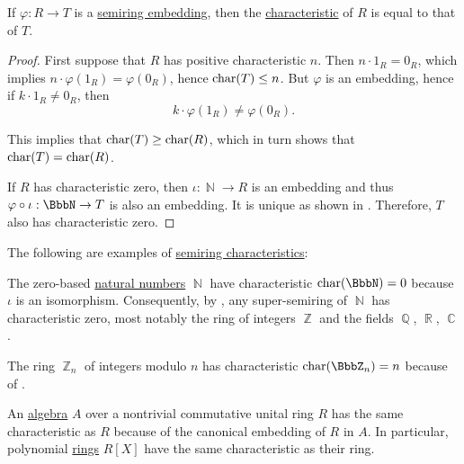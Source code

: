 \begin{proposition}\label{thm:semiring_embedding_preserves_characterstic}
  If \( \varphi: R \to T \) is a \hyperref[def:semiring/homomorphism]{semiring embedding}, then the \hyperref[def:semiring_characteristic]{characteristic} of \( R \) is equal to that of \( T \).
\end{proposition}
\begin{proof}
  First suppose that \( R \) has positive characteristic \( n \). Then \( n \cdot 1_R = 0_R \), which implies \( n \cdot \varphi(1_R) = \varphi(0_R) \), hence \( \operatorname{char}(T) \leq n \). But \( \varphi \) is an embedding, hence if \( k \cdot 1_R \neq 0_R \), then
  \begin{equation*}
    k \cdot \varphi(1_R) \neq \varphi(0_R).
  \end{equation*}

  This implies that \( \operatorname{char}(T) \geq \operatorname{char}(R) \), which in turn shows that \( \operatorname{char}(T) = \operatorname{char}(R) \).

  If \( R \) has characteristic zero, then \( \iota: \BbbN \to R \) is an embedding and thus \( \varphi \bincirc \iota: \BbbN \to T \) is also an embedding. It is unique as shown in . Therefore, \( T \) also has characteristic zero.
\end{proof}

\begin{example}\label{ex:semiring_characteristic}
  The following are examples of \hyperref[def:semiring_characteristic]{semiring characteristics}:

  \begin{thmenum}
     The zero-based \hyperref[def:set_of_natural_numbers]{natural numbers} \( \BbbN \) have characteristic \( \op{char}(\BbbN) = 0 \) because \( \iota \) is an isomorphism. Consequently, by , any super-semiring of \( \BbbN \) has characteristic zero, most notably the ring of integers \( \BbbZ \) and the fields \( \BbbQ \), \( \BbbR \), \( \BbbC \).

     The ring \hyperref[thm:ring_of_integers_modulo]{\( \BbbZ_n \)} of integers modulo \( n \) has characteristic \( \op{char}(\BbbZ_n) = n \) because of .

     An \hyperref[def:algebra_over_semiring]{algebra} \( A \) over a nontrivial commutative unital ring \( R \) has the same characteristic as \( R \) because of the canonical embedding of \( R \) in \( A \). In particular, polynomial \hyperref[def:algebra_of_polynomials]{rings} \( R[X] \) have the same characteristic as their ring.
  \end{thmenum}
\end{example}

